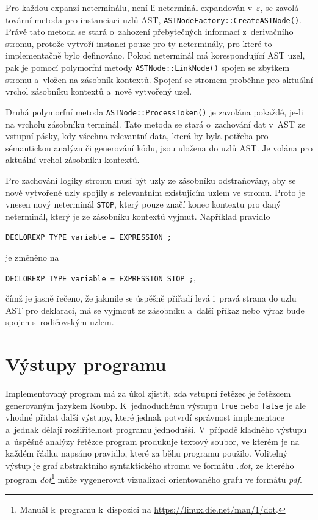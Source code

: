 Pro každou expanzi neterminálu, není-li neterminál expandován v~$\varepsilon$, se zavolá tovární metoda pro instanciaci uzlů AST, \texttt{ASTNodeFactory::CreateASTNode()}.
Právě tato metoda se stará o~zahození přebytečných informací z~derivačního stromu, protože vytvoří instanci pouze pro ty neterminály, pro které to implementačně bylo definováno.
Pokud neterminál má korespondující AST uzel, pak je pomocí polymorfní metody \texttt{ASTNode::LinkNode()} spojen se zbytkem stromu a~vložen na zásobník kontextů.
Spojení se stromem proběhne pro aktuální vrchol zásobníku kontextů a~nově vytvořený uzel.

Druhá polymorfní metoda \texttt{ASTNode::ProcessToken()} je zavolána pokaždé, je-li na vrcholu zásobníku terminál.
Tato metoda se stará o~zachování dat v~AST ze vstupní pásky, kdy všechna relevantní data, která by byla potřeba pro sémantickou analýzu či generování kódu, jsou uložena do uzlů AST.
Je volána pro aktuální vrchol zásobníku kontextů.

Pro zachování logiky stromu musí být uzly ze zásobníku odstraňovány, aby se nově vytvořené uzly spojily s~relevantním existujícím uzlem ve stromu.
Proto je vnesen nový neterminál \texttt{STOP}, který pouze značí konec kontextu pro daný neterminál, který je ze zásobníku kontextů vyjmut.
Například pravidlo
\begin{center}
    \texttt{DECLOREXP \textrightarrow{} TYPE variable = EXPRESSION ;}
\end{center}
je změněno na 
\begin{center}
    \texttt{DECLOREXP \textrightarrow{} TYPE variable = EXPRESSION STOP ;},
\end{center}
čímž je jasně řečeno, že jakmile se úspěšně přiřadí levá i~pravá strana do uzlu AST pro deklaraci, má se vyjmout ze zásobníku a~další příkaz nebo výraz bude spojen s~rodičovským uzlem.

\section{Výstupy programu}
Implementovaný program má za úkol zjistit, zda vstupní řetězec je řetězcem generovaným jazykem Koubp.
K~jednoduchému výstupu \texttt{true} nebo \texttt{false} je ale vhodné přidat další výstupy, které jednak potvrdí správnost implementace a~jednak dělají rozšiřitelnost programu jednodušší.
V~případě kladného výstupu a~úspěšné analýzy řetězce program produkuje textový soubor, ve kterém je na každém řádku napsáno pravidlo, které za běhu programu použilo.
Volitelný výstup je graf abstraktního syntaktického stromu ve formátu \emph{.dot}, ze kterého program \emph{dot}\footnote{Manuál k~programu k~dispozici na \href{https://linux.die.net/man/1/dot}{https://linux.die.net/man/1/dot}.} může vygenerovat vizualizaci orientovaného grafu ve formátu \emph{pdf}.

